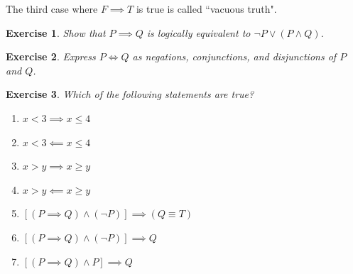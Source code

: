 \documentclass{article}[12pt]
\newtheorem{exercise}{Exercise}[section]
\begin{document}
        The third case where $F \implies T$ is true is called ``vacuous truth".
        
        \begin{exercise}
            Show that $P \implies Q$ is logically equivalent to $\neg P \lor (P \land Q)$.
        \end{exercise}
        \begin{exercise}
            Express $P \iff Q$ as negations, conjunctions, and disjunctions of $P$ and $Q$.
        \end{exercise}
        
        \begin{exercise}
            Which of the following statements are true?
            \begin{multicols}{2}
                \begin{enumerate}
                    \item
                    $x < 3 \implies x \le 4$
                    
                    \item
                    $x < 3 \impliedby x \le 4$
                    
                    \item
                    $x > y \implies x \ge y$
                    
                    \item
                    $x > y \impliedby x \ge y$
                    
                    \item
                    $[(P \implies Q) \land (\neg P)] \implies  (Q \equiv T)$
                    
                    \item
                    $[(P \implies Q) \land (\neg P)] \implies  Q$
                    
                    \item
                    $[(P \implies Q) \land P] \implies Q$
                    
                    
                    
                    
                \end{enumerate}
            \end{multicols}
        \end{exercise}
        
\end{document}
